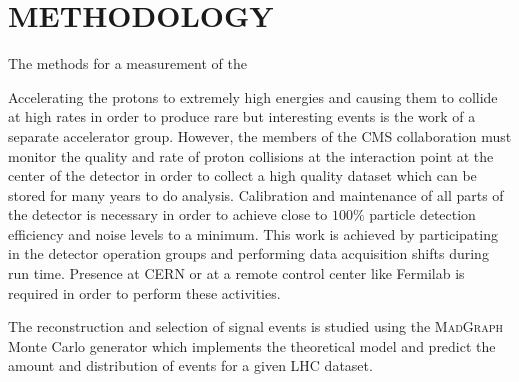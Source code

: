 \documentclass[final,3p]{CSP}
\begin{document}
\section{METHODOLOGY}





\onehalfspacing The methods for a measurement of the 

Accelerating the protons to extremely high energies and causing them to collide at high rates in order to produce rare but interesting events is the work of a separate accelerator group.
However, the members of the CMS collaboration must monitor the quality and rate of proton collisions at the interaction point at the center of the detector in order to collect a high quality dataset which can be stored for many years to do analysis.
Calibration and maintenance of all parts of the detector is necessary in order to achieve close to $100\%$ particle detection efficiency and noise levels to a minimum. This work is achieved by participating in the detector operation groups and performing data acquisition shifts during run time.  
Presence at CERN or at a remote control center like Fermilab is required in order to perform these activities. 


The reconstruction and selection of signal events is studied using the \textsc{MadGraph}~\cite{alwall2014automated} Monte Carlo generator which implements the theoretical model and predict the amount and distribution of events for a given LHC dataset.
\end{document}
